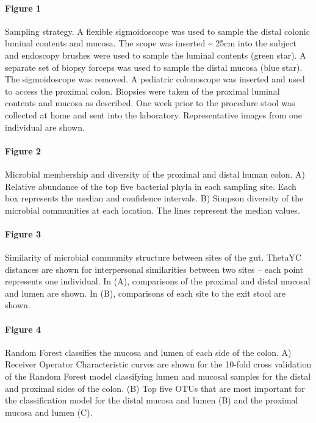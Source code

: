 \documentclass[11pt,]{article}
\let\oldparagraph\paragraph
\renewcommand{\paragraph}[1]{\oldparagraph{#1}\mbox{}}
\begin{document}
\paragraph{Figure 1}\label{figure-1}

Sampling strategy. A flexible sigmoidoscope was used to sample the
distal colonic luminal contents and mucosa. The scope was inserted
\textasciitilde{} 25cm into the subject and endoscopy brushes were used
to sample the luminal contents (green star). A separate set of biopsy
forceps was used to sample the distal mucosa (blue star). The
sigmoidoscope was removed. A pediatric colonoscope was inserted and used
to access the proximal colon. Biopsies were taken of the proximal
luminal contents and mucosa as described. One week prior to the
procedure stool was collected at home and sent into the laboratory.
Representative images from one individual are shown.

\newpage

\paragraph{Figure 2}\label{figure-2}

Microbial membership and diversity of the proximal and distal human
colon. A) Relative abundance of the top five bacterial phyla in each
sampling site. Each box represents the median and confidence intervals.
B) Simpson diversity of the microbial communities at each location. The
lines represent the median values.

\newpage

\paragraph{Figure 3}\label{figure-3}

Similarity of microbial community structure between sites of the gut.
ThetaYC distances are shown for interpersonal similarities between two
sites -- each point represents one individual. In (A), comparisons of
the proximal and distal mucosal and lumen are shown. In (B), comparisons
of each site to the exit stool are shown.

\newpage

\paragraph{Figure 4}\label{figure-4}

Random Forest classifies the mucosa and lumen of each side of the colon.
A) Receiver Operator Characteristic curves are shown for the 10-fold
cross validation of the Random Forest model classifying lumen and
mucosal samples for the distal and proximal sides of the colon. (B) Top
five OTUs that are most important for the classification model for the
distal mucosa and lumen (B) and the proximal mucosa and lumen (C).
\end{document}

